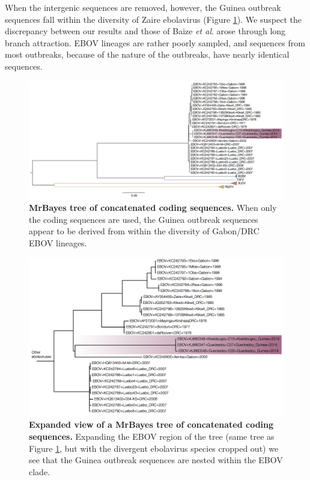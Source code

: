 \documentclass[11pt,oneside,letterpaper]{article}
\begin{document}
When the intergenic sequences are removed, however, the Guinea outbreak sequences fall within the diversity of Zaire ebolavirus (Figure \ref{MBtreeCDS}).
We suspect the discrepancy between our results and those of Baize \textit{et al}. \cite{baize2014} arose through long branch attraction.
EBOV lineages are rather poorly sampled, and sequences from most outbreaks, because of the nature of the outbreaks, have nearly identical sequences.

\begin{figure}[h!]
\centering  
\includegraphics[width=1\textwidth]  {figures/ebolavirus_cds_mb_tree.png}
\caption{\textbf{MrBayes tree of concatenated coding sequences.}
When only the coding sequences are used, the Guinea outbreak sequences appear to be derived from within the diversity of Gabon/DRC EBOV lineages.}
\label{MBtreeCDS}
\end{figure}

\begin{figure}[h!]
\centering  
\includegraphics[width=1\textwidth]  {figures/EBOV_cds_mb_tree.png}
\caption{\textbf{Expanded view of a MrBayes tree of concatenated coding sequences.}
Expanding the EBOV region of the tree (same tree as Figure \ref{MBtreeCDS}, but with the divergent ebolavirus species cropped out) we see that the Guinea outbreak sequences are nested within the EBOV clade.}
\label{MBtreeCDSzoomed}
\end{figure}
\end{document}
